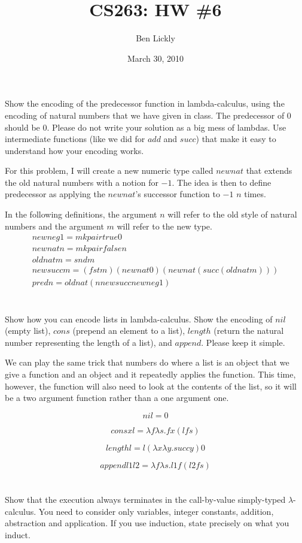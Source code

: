\documentclass{article}
\title{CS263: HW \#6}
\author{Ben Lickly}
\date{March 30, 2010}
\newcommand{\problem}[1]
{\subsubsection*{} %
\vspace{-16pt} \section{} \vspace{-22pt} \qquad
#1%
\bigskip \bigskip
}
\begin{document}
\maketitle

\problem{Show the encoding of the predecessor function in lambda-calculus, using
the encoding of natural numbers that we have given in class. The predecessor of 0
should be 0. Please do not write your solution as a big mess of lambdas. Use
intermediate functions (like we did for $add$ and $succ$) that make it easy to
understand how your encoding works.
}

For this problem, I will create a new numeric type called $newnat$ that extends
the old natural numbers with a notion for $-1$.  The idea is then to define
predecessor as applying the $newnat$'s successor function to $-1$ $n$ times.

In the following definitions, the argument $n$ will refer to the old style of
natural numbers and the argument $m$ will refer to the new type.
\begin{align*}
newneg1 = mkpair true 0 \\
newnat n = mkpair false n \\
oldnat m = snd m \\
newsucc m = (fst m) (newnat 0) (newnat (succ (oldnat m))) \\
pred n = oldnat (n newsucc newneg1)
\end{align*}

\problem{Show how you can encode lists in lambda-calculus. Show the encoding of
$nil$ (empty list), $cons$ (prepend an element to a list), $length$ (return the
natural number representing the length of a list), and $append$. Please keep it
simple.
}

We can play the same trick that numbers do where a list is an object that we
give a function and an object and it repeatedly applies the function. This
time, however, the function will also need to look at the contents of the list,
so it will be a two argument function rather than a one argument one.

\[
nil = 0
\]

\[
cons x l = \lambda f \lambda s.  f x (l f s)
\]


\[
length l = l (\lambda x \lambda y. succ y) 0
\]

\[
append l1 l2 = \lambda f \lambda s. l1 f (l2 f s)
\]

\problem{Show that the execution always terminates in the call-by-value
simply-typed $\lambda$-calculus. You need to consider only variables, integer
constants, addition, abstraction and application. If you use induction, state
precisely on what you induct.
}
\end{document}
